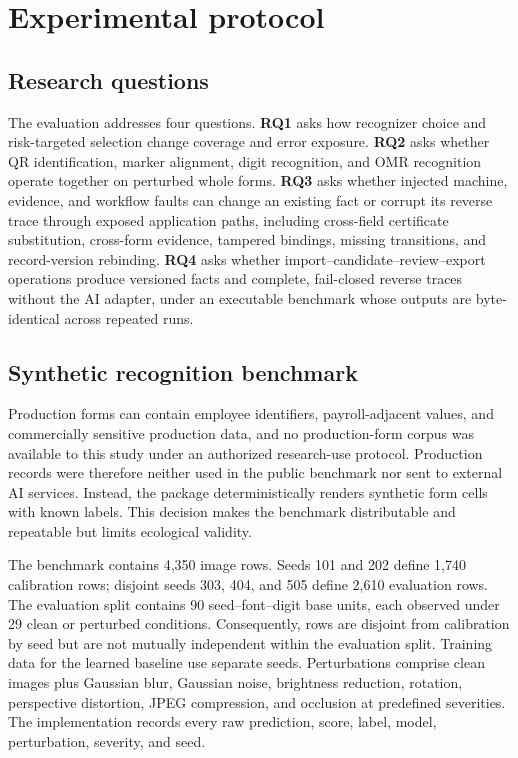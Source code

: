 \section{Experimental protocol}
\label{sec:protocol}

\subsection{Research questions}
The evaluation addresses four questions. \textbf{RQ1} asks how recognizer choice and risk-targeted selection change coverage and error exposure. \textbf{RQ2} asks whether QR identification, marker alignment, digit recognition, and OMR recognition operate together on perturbed whole forms. \textbf{RQ3} asks whether injected machine, evidence, and workflow faults can change an existing fact or corrupt its reverse trace through exposed application paths, including cross-field certificate substitution, cross-form evidence, tampered bindings, missing transitions, and record-version rebinding. \textbf{RQ4} asks whether import--candidate--review--export operations produce versioned facts and complete, fail-closed reverse traces without the AI adapter, under an executable benchmark whose outputs are byte-identical across repeated runs.

\subsection{Synthetic recognition benchmark}
Production forms can contain employee identifiers, payroll-adjacent values, and commercially sensitive production data, and no production-form corpus was available to this study under an authorized research-use protocol. Production records were therefore neither used in the public benchmark nor sent to external AI services. Instead, the package deterministically renders synthetic form cells with known labels. This decision makes the benchmark distributable and repeatable but limits ecological validity.

The benchmark contains 4,350 image rows. Seeds 101 and 202 define 1,740 calibration rows; disjoint seeds 303, 404, and 505 define 2,610 evaluation rows. The evaluation split contains 90 seed--font--digit base units, each observed under 29 clean or perturbed conditions. Consequently, rows are disjoint from calibration by seed but are not mutually independent within the evaluation split. Training data for the learned baseline use separate seeds. Perturbations comprise clean images plus Gaussian blur, Gaussian noise, brightness reduction, rotation, perspective distortion, JPEG compression, and occlusion at predefined severities. The implementation records every raw prediction, score, label, model, perturbation, severity, and seed.

